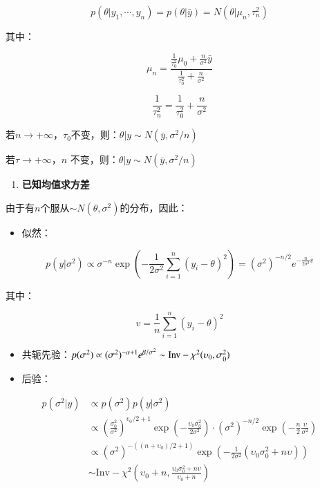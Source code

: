 \[p(\theta|y_1,\cdots,y_n)=p(\theta|\bar y)=N(\theta | \mu_n,\tau_n^2)\]

其中：

\[\mu_{n}=\frac{\frac{1}{\tau_{0}^{2}} \mu_{0}+\frac{n}{\sigma^{2}} \bar{y}}{\frac{1}{\tau_{0}^{2}}+\frac{n}{\sigma^{2}}}\]

\[\frac{1}{\tau_{n}^{2}}=\frac{1}{\tau_{0}^{2}}+\frac{n}{\sigma^{2}}\]

若\(n\rightarrow+\infty\)，\(\tau_0\)不变，则：\(\theta|y\sim N(\bar{y},\sigma^2/n)\)

若\(\tau\rightarrow+\infty\)，\(n\)
不变，则：\(\theta|y\sim N(\bar{y},\sigma^2/n)\)

\begin{enumerate}
\def\labelenumi{\arabic{enumi}.}
\item
  \textbf{已知均值求方差}
\end{enumerate}

由于有\(n\)个服从\(\sim N(\theta,\sigma^2)\)的分布，因此：

\begin{itemize}
\item
  似然：
\end{itemize}

\begin{equation}
  p(y|\sigma^2)\propto\sigma^{-n}\exp\left(-
\frac{1}{2\sigma^2}\sum_{i=1}^{n}(y_i-\theta)^2
\right)=(\sigma^2)^{-n/2}e^{-\frac{n}{2\sigma^2}v}
\end{equation}


其中：

\[v=\frac{1}{n}\sum_{i=1}^n(y_i-\theta)^2\]

\begin{itemize}
\item
  共轭先验：\(p(\sigma^2)\propto(\sigma^2)^{-\alpha+1}e^{\beta/\sigma^2} \sim \rm Inv-\chi^2(\upsilon_0,\sigma^2_0)\)
\item
  后验：
\end{itemize}

\begin{equation}
    \begin{aligned}
        p(\sigma^2|y)&\propto p(\sigma^2)p(y|\sigma^2)\\
        &\propto \left( \frac{\sigma^2_0}{\sigma^2} \right)^{v_0/2+1}
        \exp\left( -\frac{\upsilon_0\sigma^2_0}{2\sigma^2} \right)\cdot
        (\sigma^2)^{-n/2}\exp\left(-\frac{n}{2}\frac{\upsilon}{\sigma^2}\right)\\
        &\propto (\sigma^2)^{-((n+\upsilon_0)/2+1)}\exp\left(
        -\frac{1}{2\sigma^2}(\upsilon_0\sigma_0^2+n\upsilon)
        \right)\\
        &\sim \textrm{Inv}-\chi^2(\upsilon_0+n,\frac{\upsilon_0\sigma_0^2+n\upsilon}{\upsilon_0+n})
        \end{aligned}
\end{equation}
